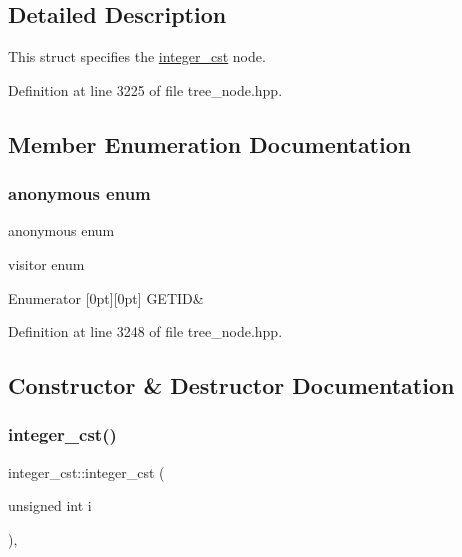 \subsection{Detailed Description}
This struct specifies the \hyperlink{structinteger__cst}{integer\+\_\+cst} node. 

Definition at line 3225 of file tree\+\_\+node.\+hpp.



\subsection{Member Enumeration Documentation}
\mbox{\label{structinteger__cst_a6e9d0b904a8d4df919420f3bd592f2eb}} 
\subsubsection{\texorpdfstring{anonymous enum}{anonymous enum}}
{\footnotesize\ttfamily anonymous enum}



visitor enum 

\begin{DoxyEnumFields}{Enumerator}
[0pt][0pt]{}\mbox{\label{structinteger__cst_a6e9d0b904a8d4df919420f3bd592f2eba93f629accd52e2a6199c4d10fe560b91}} 
G\+E\+T\+ID&\\
\hline

\end{DoxyEnumFields}


Definition at line 3248 of file tree\+\_\+node.\+hpp.



\subsection{Constructor \& Destructor Documentation}
\mbox{\label{structinteger__cst_a9a9bfe3c8805b4db1d6edb1570091feb}} 
\subsubsection{\texorpdfstring{integer\+\_\+cst()}{integer\_cst()}}
{\footnotesize\ttfamily integer\+\_\+cst\+::integer\+\_\+cst (\begin{DoxyParamCaption}\item[{unsigned int}]{i }\end{DoxyParamCaption})\hspace{0.3cm}{\ttfamily [inline]}, {\ttfamily [explicit]}}



